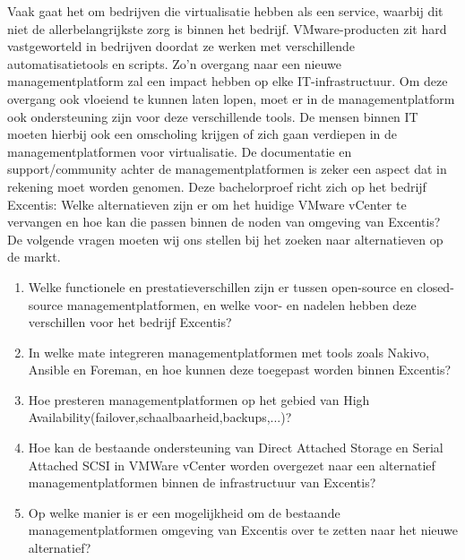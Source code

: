 Vaak gaat het om bedrijven die virtualisatie hebben als een service, waarbij dit niet de allerbelangrijkste zorg is binnen het bedrijf.
VMware-producten zit hard vastgeworteld in bedrijven doordat ze werken met verschillende automatisatietools en scripts. Zo'n overgang naar een nieuwe managementplatform zal een impact hebben op elke IT-infrastructuur.
Om deze overgang ook vloeiend te kunnen laten lopen, moet er in de managementplatform ook ondersteuning zijn voor deze verschillende tools.
De mensen binnen IT moeten hierbij ook een omscholing krijgen of zich gaan verdiepen in de managementplatformen  voor virtualisatie. De documentatie en support/community achter de managementplatformen is zeker een aspect dat in rekening moet worden genomen.
Deze bachelorproef richt zich op het bedrijf Excentis: Welke alternatieven zijn er om het huidige VMware vCenter te vervangen en hoe kan die passen binnen de noden van omgeving van Excentis?
De volgende vragen moeten wij ons stellen bij het zoeken naar alternatieven op de markt.
\begin{enumerate}
\item Welke functionele en prestatieverschillen zijn er tussen open-source en closed-source managementplatformen, en welke voor- en nadelen hebben deze verschillen voor het bedrijf Excentis?
\item In welke mate integreren managementplatformen met tools zoals Nakivo, Ansible en Foreman, en hoe kunnen deze toegepast worden binnen Excentis?
\item Hoe presteren managementplatformen op het gebied van High Availability(failover,\newline schaalbaarheid,backups,...)?
\item Hoe kan de bestaande ondersteuning van Direct Attached Storage en Serial Attached SCSI in VMWare vCenter worden overgezet naar een alternatief managementplatformen binnen de infrastructuur van Excentis?
\item Op welke manier is er een mogelijkheid om de bestaande managementplatformen omgeving van Excentis over te zetten naar het nieuwe alternatief?
\end{enumerate}





